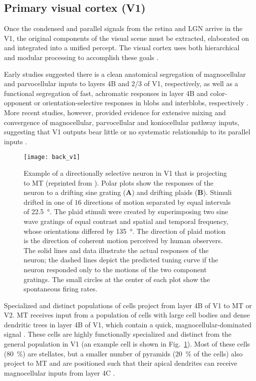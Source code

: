 \subsection{Primary visual cortex (V1)}
\label{sec:BKG|V1}

Once the condensed and parallel signals from the retina
and \ac{LGN} arrive in the \acf{V1}, the original components
of the visual scene must be extracted, elaborated
on and integrated into a unified percept. The visual
cortex uses both hierarchical and modular processing
to accomplish these goals \citep{ZekiShipp1988}.

Early studies suggested there is a clean
anatomical segregation of magnocellular and parvocellular
inputs to layers 4B and 2/3 of \ac{V1}, respectively, as well
as a functional segregation of fast, achromatic responses
in layer 4B and color-opponent or orientation-selective
responses in blobs and interblobs, respectively
\citep{LivingstoneHubel1984,Hawken1988}.
More recent studies, however, provided evidence for 
extensive mixing and convergence of magnocellular, parvocellular and 
koniocellular pathway inputs, suggesting that \ac{V1}
outputs bear little or no systematic relationship to its parallel inputs
\citep{SincichHorton2004}.

\begin{figure}[t]
  \centering
  \texttt{[image: back\_v1]}
  \caption{
  Example of a directionally selective neuron in \ac{V1} that is projecting to \ac{MT} (reprinted from \cite{MovshonNewsome1996}).
  Polar plots show the responses of the neuron to a drifting sine grating
  (\textbf{A}) and drifting plaids (\textbf{B}).
  Stimuli drifted in one of $16$ directions of motion separated by equal 
  intervals of \SI{22.5}{\degree}. The plaid stimuli were created by
  superimposing two sine wave gratings of equal contrast and spatial
  and temporal frequency, whose orientations differed by \SI{135}{\degree}.
  The direction of plaid motion is the direction of coherent motion
  perceived by human observers.
  The solid lines and data illustrate the actual responses of the neuron;
  the dashed lines depict the predicted tuning curve if the neuron responded
  only to the motions of the two component gratings.
  The small circles at the center of each plot show the spontaneous firing
  rates.
  }
  \label{fig:BKG|V1}
\end{figure}

Specialized and distinct populations of cells project 
from layer 4B of \ac{V1} to \ac{MT} or V2.
\ac{MT} receives input from a population of cells with large cell bodies
and dense dendritic trees in layer 4B of \ac{V1}, 
which contain a quick, magnocellular-dominated signal
\citep{MovshonNewsome1996}.
These cells are highly functionally specialized and distinct from
the general population in \ac{V1} 
(an example cell is shown in Fig.~\ref{fig:BKG|V1}).
Most of these cells (\SI{80}{\percent}) are stellates, 
but a smaller number of pyramids (\SI{20}{\percent} of the cells) also
project to \ac{MT} and are positioned such that their apical dendrites
can receive magnocellular inputs from layer 4C\textalpha{} 
\citep{MovshonNewsome1996,NassiCallaway2007}.



